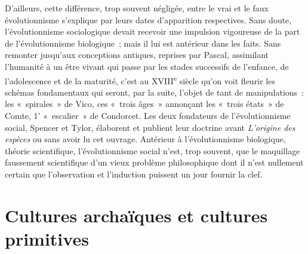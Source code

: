 \documentclass[french,twoside]{book} %
\begin{document}
D’ailleurs, cette différence, trop souvent négligée, entre le vrai et le faux évolutionnisme s’explique par leurs dates d’apparition respectives. Sans doute, l’évolutionnisme sociologique devait recevoir une impulsion vigoureuse de la part de l’évolutionnisme biologique ; mais il lui est antérieur dans les faits. Sans remonter jusqu’aux conceptions antiques, reprises par Pascal, assimilant l’humanité à un être vivant qui passe par les stades successifs de l’enfance, de l’adolescence et de la maturité, c’est au XVIII\textsuperscript{e} siècle qu’on voit fleurir les schémas fondamentaux qui seront, par la suite, l’objet de tant de manipulations : les « spirales » de Vico, ces « trois âges » annonçant les « trois états » de Comte, 1’ « escalier » de Condorcet. Les deux fondateurs de l’évolutionnisme social, Spencer et Tylor, élaborent et publient leur doctrine avant \emph{L’origine des espèces} ou sans avoir lu cet ouvrage. Antérieur à l’évolutionnisme biologique, théorie scientifique, l’évolutionnisme social n’est, trop souvent, que le maquillage faussement scientifique d’un vieux problème philosophique dont il n’est nullement certain que l’observation et l’induction puissent un jour fournir la clef.

\section[{Cultures archaïques et cultures primitives}]{Cultures archaïques et cultures primitives}
\renewcommand{\leftmark}{Cultures archaïques et cultures primitives}
\end{document}
